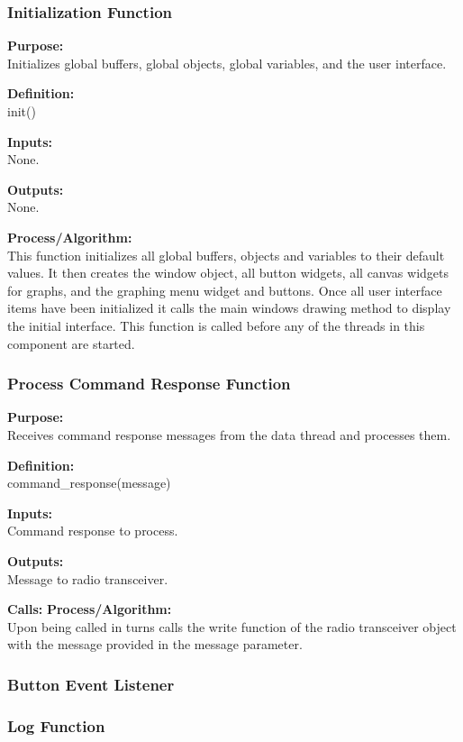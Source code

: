 \documentclass[10pt,draftclsnofoot,onecolumn,compsoc]{IEEEtran}
\begin{document}
\subsubsection{Initialization Function}
{\bf Purpose:} \\
Initializes global buffers, global objects, global variables, and the user interface. \par
{\bf Definition:} \\ 
init() \par
{\bf Inputs:} \\ None. \par
{\bf Outputs:} \\None. \par
{\bf Process/Algorithm:} \\
This function initializes all global buffers, objects and variables to their default values. It then creates the window object, all button widgets, all canvas widgets for graphs, and the graphing menu widget and buttons. Once all user interface items have been initialized it calls the main windows drawing method to display the initial interface. This function is called before any of the threads in this component are started. \par
\subsubsection{Process Command Response Function}
{\bf Purpose:} \\
Receives command response messages from the data thread and processes them.  \par
{\bf Definition:} \\ 
command\_response(message) \par
{\bf Inputs:} \\  Command response to process. \par
{\bf Outputs:} \\ Message to radio transceiver. \par
{\bf Calls:}
{\bf Process/Algorithm:} \\
Upon being called in turns calls the write function of the radio transceiver object with the message provided in the message parameter. \par
\subsubsection{Button Event Listener}
\subsubsection{Log Function}
\end{document}
